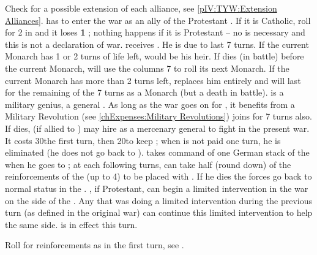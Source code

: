 
\phevnt
\aparag Check for a possible extension of each alliance, see
\ref{pIV:TYW:Extension Alliances}.
\aparag \SUE has to enter the war as an ally of the Protestant \alliance.  If
it is Catholic, roll for 2 \REVOLT in \SUE and it loses {\bf 1} \STAB ;
nothing happens if it is Protestant -- no \CB is necessary and this is not a
declaration of war.
 \SUE receives . He is
due to last 7 turns.
\bparag If the current Monarch has 1 or 2 turns of life left,
 would be his heir. If 
dies (in battle) before the current Monarch, \SUE will use the columns 7 to
roll its next Monarch.
\bparag If the current Monarch has more than 2 turns left,  replaces him entirely and will last for the remaining of the 7
turns as a Monarch (but a death in battle).
\bparag {} is a military genius, a general
. As long as the war goes on for \SUE, it
benefits from a Military Revolution (see \ref{chExpenses:Military
  Revolutions})
\label{pIV:TYW:Saxe-Weimar}
 joins \SUE for 7 turns also.
\bparag If  dies, \FRA (if allied to \SUE) may hire
 as a mercenary general to fight in the present war.  It
costs 30\ducats the first turn, then 20\ducats to keep ;
when  is not paid one turn, he is eliminated (he does not
go back to \SUE).  takes command of one German stack of
the \alliance when he goes to \FRA; at each following turns, \FRA can take
half (round down) of the reinforcements of the \alliance (up to 4\LD) to be
placed with .  If he dies the forces go back to normal
status in the \alliance.
\aparag \FRA, if Protestant, can begin a limited intervention in the war on
the side of the \alliance.
\aparag Any \MAJ that was doing a limited intervention during the previous
turn (as defined in the original war) can continue this limited intervention
to help the same side.
\aparag {} is in effect this turn.

\phadm
\aparag Roll for reinforcements as in the first turn, see
.

